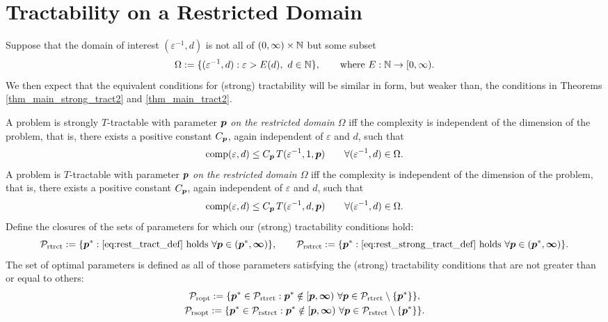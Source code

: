 \documentclass[11pt,a4paper]{article}
\newcommand{\peter}[1]{\begingroup\color{purple}#1\endgroup}
\begin{document}
\section{Tractability on a Restricted Domain}

Suppose that the domain of interest $(\varepsilon^{-1},d)$ is not all of $(0,\infty) \times \mathbb{N}$ but some subset
\begin{equation}
    \Omega  := \{(\varepsilon^{-1},d) : \varepsilon > E(d), \ d \in \mathbb{N} \}, \qquad \text{where }E : \mathbb{N} \to [0,\infty).
\end{equation}
We then expect that the equivalent conditions for (strong) tractability will be similar in form, but weaker than, the conditions in Theorems  \ref{thm_main_strong_tract2} and \ref{thm_main_tract2}.

\begin{definition}
    A problem is strongly
$T$-tractable with parameter $\boldsymbol{p}$ \emph{on the restricted domain $\Omega$} iff the complexity is independent of the dimension of the problem, that is, there exists a positive constant $C_{\boldsymbol{p}}$, again independent of $\varepsilon$ and $d$, such that
\begin{equation} \label{eq:rest_strong_tract_def}
	\operatorname{comp}(\varepsilon,d) \le C_{\boldsymbol{p}}\, T(\varepsilon^{-1},1,\boldsymbol{p}) \qquad \forall(\varepsilon^{-1},d) \in \Omega.
\end{equation}
A problem is 
$T$-tractable with parameter $\boldsymbol{p}$ \emph{on the restricted domain $\Omega$} iff the complexity is independent of the dimension of the problem, that is, there exists a positive constant $C_{\boldsymbol{p}}$, again independent of $\varepsilon$ and $d$, such that
\begin{equation} \label{eq:rest_tract_def}
	\operatorname{comp}(\varepsilon,d) \le C_{\boldsymbol{p}}\, T(\varepsilon^{-1},d,\boldsymbol{p}) \qquad \forall(\varepsilon^{-1},d) \in \Omega.
\end{equation}
 Define the closures of the sets of parameters for which our (strong) tractability conditions hold:
\begin{equation*}
	\mathcal{P}_{\textup{rtrct}} : = \{\boldsymbol{p}^* : \eqref{eq:rest_tract_def} \text{ holds }\forall \boldsymbol{p} \in (\boldsymbol{p}^*,\boldsymbol{\infty})\}, \qquad
	\mathcal{P}_{\textup{rstrct}} : = \{\boldsymbol{p}^* : \eqref{eq:rest_strong_tract_def} \text{ holds }\forall \boldsymbol{p} \in (\boldsymbol{p}^*,\boldsymbol{\infty})\}.
\end{equation*}
    The  set of optimal parameters is defined as all of those parameters satisfying the (strong) tractability conditions that are not greater than or equal to others:
\begin{gather}
	\label{eq:Poptdef}
	\mathcal{P}_{\textup{ropt}} : = \{\boldsymbol{p}^* \in \mathcal{P}_{\textup{rtrct}} :  \boldsymbol{p}^* \notin [\boldsymbol{p},\boldsymbol{\infty}) \ \forall \boldsymbol{p} \in  \mathcal{P}_{\textup{rtrct}} \setminus \{\boldsymbol{p}^*\} \}, \\
	\label{eq:Psoptdef}
	\mathcal{P}_{\textup{rsopt}} : = \{\boldsymbol{p}^* \in \mathcal{P}_{\textup{rstrct}} :  \boldsymbol{p}^* \notin [\boldsymbol{p},\boldsymbol{\infty}) \ \forall \boldsymbol{p} \in  \mathcal{P}_{\textup{rstrct}} \setminus \{\boldsymbol{p}^*\} \}.
\end{gather}
\end{definition}
\end{document}
